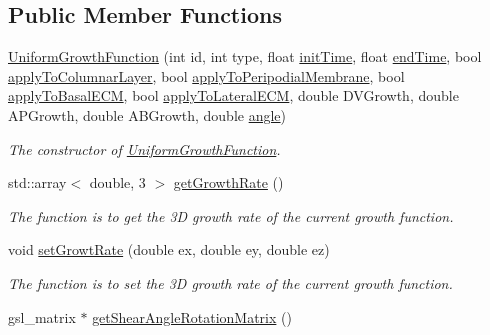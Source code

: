 \subsection*{Public Member Functions}
\begin{DoxyCompactItemize}
\item 
\hyperlink{classUniformGrowthFunction_a9ea553c72b2d5e83e98e4ec7a8c025b6}{Uniform\+Growth\+Function} (int id, int type, float \hyperlink{classGrowthFunctionBase_ae92513a7b41637df8e26e7db35ddf97c}{init\+Time}, float \hyperlink{classGrowthFunctionBase_a3ff4db0573d354a75666a5f3ca446941}{end\+Time}, bool \hyperlink{classGrowthFunctionBase_a3d56771e7c145589a14e11cc331e0326}{apply\+To\+Columnar\+Layer}, bool \hyperlink{classGrowthFunctionBase_a08ae19f58cb98fa8e315a77f52749732}{apply\+To\+Peripodial\+Membrane}, bool \hyperlink{classGrowthFunctionBase_a9fe46fc6dde4041b79204beb48972a09}{apply\+To\+Basal\+E\+C\+M}, bool \hyperlink{classGrowthFunctionBase_ac623b1dbe376bce5dddbe1a2e21c776f}{apply\+To\+Lateral\+E\+C\+M}, double D\+V\+Growth, double A\+P\+Growth, double A\+B\+Growth, double \hyperlink{classUniformGrowthFunction_a1a985ff52f9796688e00942b4d3349f8}{angle})
\begin{DoxyCompactList}\small\item\em The constructor of \hyperlink{classUniformGrowthFunction}{Uniform\+Growth\+Function}. \end{DoxyCompactList}\item 
std\+::array$<$ double, 3 $>$ \hyperlink{classUniformGrowthFunction_a07c289d1e99b46d0629dbd229cf3b952}{get\+Growth\+Rate} ()
\begin{DoxyCompactList}\small\item\em The function is to get the 3\+D growth rate of the current growth function. \end{DoxyCompactList}\item 
void \hyperlink{classUniformGrowthFunction_aff899907569af697d47927f61b6871a5}{set\+Growt\+Rate} (double ex, double ey, double ez)
\begin{DoxyCompactList}\small\item\em The function is to set the 3\+D growth rate of the current growth function. \end{DoxyCompactList}\item 
\hypertarget{classUniformGrowthFunction_a5a7e9b102a299b94ba648513b66f9cd1}{}gsl\+\_\+matrix $\ast$ \hyperlink{classUniformGrowthFunction_a5a7e9b102a299b94ba648513b66f9cd1}{get\+Shear\+Angle\+Rotation\+Matrix} ()\label{classUniformGrowthFunction_a5a7e9b102a299b94ba648513b66f9cd1}


\end{DoxyCompactItemize}
